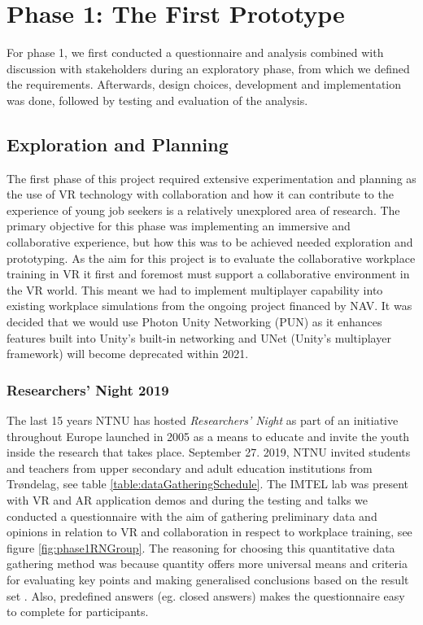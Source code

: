 
\chapter{Phase 1: The First Prototype}
\label{chap:phase1}

For phase 1, we first conducted a questionnaire and analysis combined with discussion with stakeholders during an exploratory phase, from which we defined the requirements. Afterwards, design choices, development and implementation was done, followed by testing and evaluation of the analysis.


\section{Exploration and Planning}
The first phase of this project required extensive experimentation and planning as the use of VR technology with collaboration and how it can contribute to the experience of young job seekers is a relatively unexplored area of research. The primary objective for this phase was implementing an immersive and collaborative experience, but how this was to be achieved needed exploration and prototyping. As the aim for this project is to evaluate the collaborative workplace training in VR it first and foremost must support a collaborative environment in the VR world. This meant we had to implement multiplayer capability into existing workplace simulations from the ongoing project financed by NAV. It was decided that we would use Photon Unity Networking (PUN) \cite{PUN} as it enhances features built into Unity's built-in networking and UNet (Unity's multiplayer framework) will become deprecated within 2021.  


\subsection{Researchers' Night 2019}
The last 15 years NTNU has hosted \textit{Researchers' Night} as part of an initiative throughout Europe launched in 2005 as a means to educate and invite the youth inside the research that takes place. September 27. 2019, NTNU invited students and teachers from upper secondary and adult education institutions from Trøndelag, see table \ref{table:dataGatheringSchedule}. The IMTEL lab was present with VR and AR application demos and during the testing and talks we conducted a questionnaire with the aim of gathering preliminary data and opinions in relation to VR and collaboration in respect to workplace training, see figure \ref{fig:phase1RNGroup}. The reasoning for choosing this quantitative data gathering method was because quantity offers more universal means and criteria for evaluating key points and making generalised conclusions based on the result set \cite{oates2005researching}. Also, predefined answers (eg. closed answers) makes the questionnaire easy to complete for participants.

